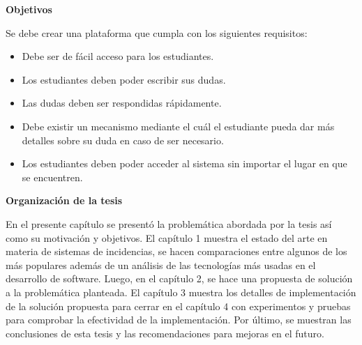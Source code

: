 \textbf{Objetivos}
\newline

Se debe crear una plataforma que cumpla con los siguientes requisitos:
\begin{itemize}
	\item Debe ser de fácil acceso para los estudiantes.
	
	\item Los estudiantes deben poder escribir sus dudas.
	
	\item Las dudas deben ser respondidas rápidamente.
	
	\item Debe existir un mecanismo mediante el cuál el estudiante pueda dar más detalles sobre su duda en caso de ser necesario.
	
	\item Los estudiantes deben poder acceder al sistema sin importar el lugar en que se encuentren.
\end{itemize}
\newline

\textbf{Organización de la tesis}
\newline

En el presente capítulo se presentó la problemática abordada
por la tesis así como su motivación y objetivos. El capítulo
1 muestra el estado del arte en materia de sistemas de incidencias, se hacen comparaciones entre algunos de los más populares además de un análisis de las tecnologías más usadas en el desarrollo de software. Luego, en el capítulo 2, se hace una propuesta de solución a la problemática planteada. El capítulo 3 muestra los detalles de implementación de la solución propuesta para cerrar en el capítulo 4 con experimentos y pruebas para comprobar la efectividad de la implementación. Por último, se muestran las conclusiones de esta tesis y las recomendaciones para mejoras en el futuro.